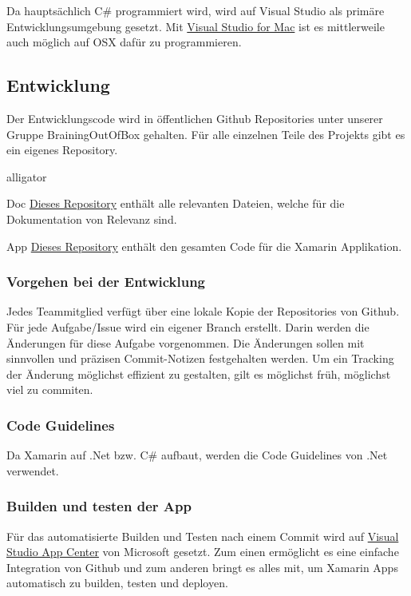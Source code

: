 Da hauptsächlich C\# programmiert wird, wird auf Visual Studio als primäre Entwicklungsumgebung gesetzt. Mit \href{https://visualstudio.microsoft.com/de/vs/mac/}{Visual Studio for Mac} ist es mittlerweile auch möglich auf OSX dafür zu programmieren.


\subsection{Entwicklung}
Der Entwicklungscode wird in öffentlichen Github Repositories unter unserer Gruppe BrainingOutOfBox gehalten. Für alle einzelnen Teile des Projekts gibt es ein eigenes Repository.

\begin{labeling}{alligator}
\item [Doc] \href{https://github.com/BrainingOutOfBox/Doc}{Dieses Repository} enthält alle relevanten Dateien, welche für die Dokumentation von Relevanz sind.
\item [App] \href{https://github.com/BrainingOutOfBox/Doc}{Dieses Repository} enthält den gesamten Code für die Xamarin Applikation.
\end{labeling}

\subsubsection*{Vorgehen bei der Entwicklung}
Jedes Teammitglied verfügt über eine lokale Kopie der Repositories von Github. Für jede Aufgabe/Issue wird ein eigener Branch erstellt. Darin werden die Änderungen für diese Aufgabe vorgenommen. Die Änderungen sollen mit sinnvollen und präzisen Commit-Notizen festgehalten werden. Um ein Tracking der Änderung möglichst effizient zu gestalten, gilt es möglichst früh, möglichst viel zu commiten.

\subsubsection*{Code Guidelines}
Da Xamarin auf .Net bzw. C\# aufbaut, werden die Code Guidelines von .Net verwendet. \cite{guidelines-DotNet}

\subsubsection*{Builden und testen der App}
Für das automatisierte Builden und Testen nach einem Commit wird auf \href{https://appcenter.ms/orgs/BrainingOutOfBox/apps/BrainingOutOfBox-App}{Visual Studio App Center} von Microsoft gesetzt. Zum einen ermöglicht es eine einfache Integration von Github und zum anderen bringt es alles mit, um Xamarin Apps automatisch zu builden, testen und deployen. 

